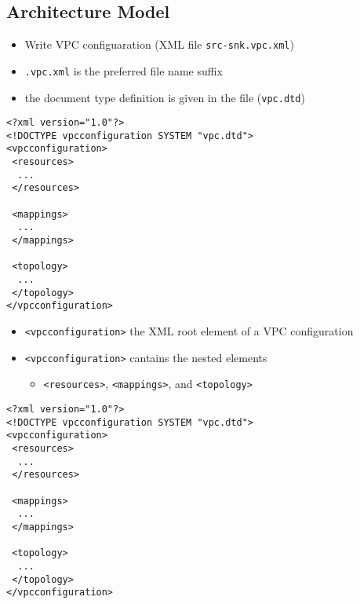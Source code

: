 \subsection{Architecture Model}


\begin{frame}[fragile=singleslide]
\begin{itemize}
\item Write VPC configuaration (XML file \lstinline!src-snk.vpc.xml!)
\item \lstinline!.vpc.xml! is the preferred file name suffix
\item the document type definition is given in the file (\lstinline!vpc.dtd!)
\end{itemize}

\begin{lstlisting}
<?xml version="1.0"?>
<!DOCTYPE vpcconfiguration SYSTEM "vpc.dtd">
<vpcconfiguration>
 <resources>
  ...
 </resources>

 <mappings>
  ...
 </mappings>

 <topology>
  ...
 </topology>
</vpcconfiguration>
\end{lstlisting}
\end{frame}


\begin{frame}[fragile=singleslide]
\begin{itemize}
\item \lstinline!<vpcconfiguration>! the XML root element of a VPC configuration
\item \lstinline!<vpcconfiguration>! cantains the nested elements
  \begin{itemize}
  \item \lstinline!<resources>!, \lstinline!<mappings>!, and \lstinline!<topology>!
  \end{itemize}
\end{itemize}

\begin{lstlisting}
<?xml version="1.0"?>
<!DOCTYPE vpcconfiguration SYSTEM "vpc.dtd">
<vpcconfiguration>
 <resources>
  ...
 </resources>

 <mappings>
  ...
 </mappings>

 <topology>
  ...
 </topology>
</vpcconfiguration>
\end{lstlisting}
\end{frame}


